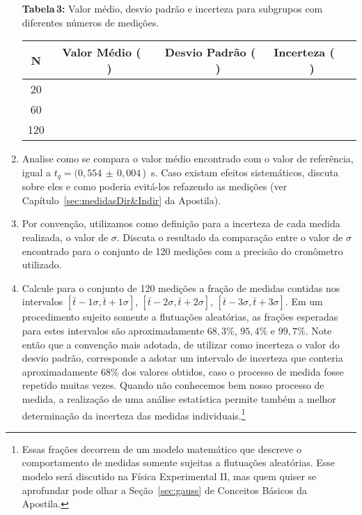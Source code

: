 \begin{enumerate}
\begin{center}
{{\bf Tabela\,3:} Valor médio, desvio padrão e incerteza para subgrupos com diferentes números de medições.}

  \begin{tabular}{|c|c|c|c|} \hline
  \bf N & \bf Valor Médio ($\;\;\;\;\;$)& \bf Desvio Padrão ($\;\;\;\;\;$) &  \bf Incerteza ($\;\;\;\;\;$)\\ \hline
   20 & & & \\ \hline
   60 & & & \\ \hline
  120 & & & \\ \hline
\end{tabular}
\label{tab:2060120med}
\end{center}

\item Analise como se compara o valor médio encontrado com o valor de referência, igual a $t_{q}= (0,554\,\pm\,0,004\,$)~s.  Caso existam efeitos sistemáticos, discuta sobre eles e como poderia evitá-los refazendo as medições (ver Capítulo~\ref{sec:medidasDir&Indir}  da Apostila).

\item Por convenção, utilizamos como definição para a incerteza de cada medida realizada, o valor de $\sigma$. Discuta o resultado da comparação entre o valor de $\sigma$ encontrado para o conjunto de 120 medições com a precisão do cronômetro utilizado.  

\item Calcule para o conjunto de 120 medições a fração de medidas contidas nos intervalos $[\bar{t}-1\sigma, \bar{t}+1\sigma]$, 
$[\bar{t}-2\sigma, \bar{t}+2\sigma]$, $[\bar{t}-3\sigma, \bar{t}+3 \sigma]$.  Em um procedimento sujeito somente a flutuações aleatórias, as frações esperadas para estes intervalos são aproximadamente $68,3\%$, $95,4\%$ e $99,7\%$. Note então que a convenção mais adotada, de utilizar como incerteza o valor do desvio padrão, corresponde a adotar um intervalo de incerteza que conteria aproximadamente $68\%$ dos valores obtidos, caso o processo de medida fosse repetido muitas vezes. Quando não conhecemos bem nosso processo de medida, a realização de uma análise estatística permite também a melhor determinação da incerteza das medidas individuais.\footnote{Essas frações decorrem de um modelo matemático que descreve o comportamento de medidas somente sujeitas a flutuações aleatórias. Esse modelo será discutido na Física Experimental II, mas quem quiser se aprofundar pode olhar a Seção~\ref{sec:gauss} %
de Conceitos Básicos da Apostila.} 
\end{enumerate}

